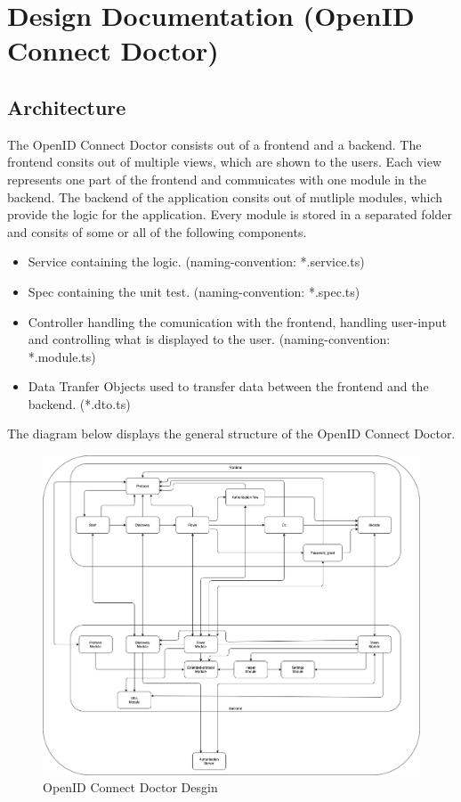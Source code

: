 \documentclass{article}
\begin{document}
\section*{Design Documentation (OpenID Connect Doctor)}
\subsection*{Architecture}
The OpenID Connect Doctor consists out of a frontend and a backend. The frontend consits out of multiple views, which are shown to the users. Each view represents one part of the frontend and commuicates with one module in the backend. The backend of the application consits out of mutliple modules, which provide the logic for the application. Every module is stored in a separated folder and consits of some or all of the following components. 
\begin{itemize}
    \item Service containing the logic. (naming-convention: *.service.ts)
    \item Spec containing the unit test. (naming-convention: *.spec.ts)
    \item Controller handling the comunication with the frontend, handling user-input and controlling what is displayed to the user. (naming-convention: *.module.ts)
    \item Data Tranfer Objects used to transfer data between the frontend and the backend. (*.dto.ts)
\end{itemize} 
The diagram below displays the general structure of the OpenID Connect Doctor.

\begin{figure}[h]
    \centering
    \includegraphics[width=\textwidth]{design}
    \caption{OpenID Connect Doctor Desgin}
\end{figure}
\end{document}
